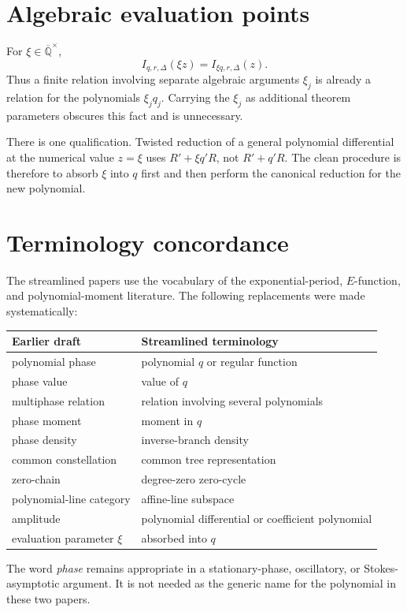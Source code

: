 \documentclass[11pt]{article}
\theoremstyle{definition}
\newcommand{\Qbar}{\overline{\mathbb Q}}
\begin{document}
\section{Algebraic evaluation points}

For $\xi\in\Qbar^\times$,
\[
  I_{q,r,\Delta}(\xi z)=I_{\xi q,r,\Delta}(z).
\]
Thus a finite relation involving separate algebraic arguments $\xi_j$ is
already a relation for the polynomials $\xi_jq_j$.  Carrying the $\xi_j$ as
additional theorem parameters obscures this fact and is unnecessary.

There is one qualification.  Twisted reduction of a general polynomial
differential at the numerical value $z=\xi$ uses
$R'+\xi q'R$, not $R'+q'R$.  The clean procedure is therefore to absorb
$\xi$ into $q$ first and then perform the canonical reduction for the new
polynomial.

\section{Terminology concordance}

The streamlined papers use the vocabulary of the exponential-period,
$E$-function, and polynomial-moment literature.  The following replacements
were made systematically:
\begin{center}
\begin{tabular}{ll}
Earlier draft & Streamlined terminology\\[2pt]
\hline
polynomial phase & polynomial $q$ or regular function\\
phase value & value of $q$\\
multiphase relation & relation involving several polynomials\\
phase moment & moment in $q$\\
phase density & inverse-branch density\\
common constellation & common tree representation\\
zero-chain & degree-zero zero-cycle\\
polynomial-line category & affine-line subspace\\
amplitude & polynomial differential or coefficient polynomial\\
evaluation parameter $\xi$ & absorbed into $q$\\
\end{tabular}
\end{center}

The word \emph{phase} remains appropriate in a stationary-phase, oscillatory,
or Stokes-asymptotic argument.  It is not needed as the generic name for the
polynomial in these two papers.
\end{document}
